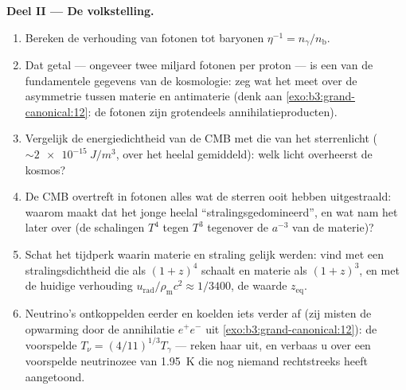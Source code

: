 \begin{problem}
\medskip\noindent\textbf{Deel II --- De volkstelling.}
\begin{enumerate}[resume]
  \item Bereken de verhouding van fotonen tot baryonen $\eta^{-1} =
        n_\gamma/n_{\text{b}}$.
  \item Dat getal --- ongeveer twee miljard fotonen per proton --- is een
        van de fundamentele gegevens van de kosmologie: zeg wat het meet
        over de asymmetrie tussen materie en antimaterie (denk aan
        \cref{exo:b3:grand-canonical:12}: de fotonen zijn grotendeels
        annihilatieproducten).
  \item Vergelijk de energiedichtheid van de CMB met die van het
        sterrenlicht ($\sim\qty{2e-15}{J/m^3}$, over het heelal
        gemiddeld): welk licht overheerst de kosmos?
  \item De CMB overtreft in fotonen alles wat de sterren ooit hebben
        uitgestraald: waarom maakt dat het jonge heelal
        ``stralingsgedomineerd'', en wat nam het later over (de schalingen
        $T^4$ tegen $T^3$ tegenover de $a^{-3}$ van de materie)?
  \item Schat het tijdperk waarin materie en straling gelijk werden: vind
        met een stralingsdichtheid die als $(1+z)^4$ schaalt en materie
        als $(1+z)^3$, en met de huidige verhouding
        $u_{\text{rad}}/\rho_{\text{m}}c^2 \approx 1/3400$, de waarde
        $z_{\text{eq}}$.
  \item Neutrino's ontkoppelden eerder en koelden iets verder af (zij
        misten de opwarming door de annihilatie $e^+e^-$ uit
        \cref{exo:b3:grand-canonical:12}): de voorspelde $T_\nu = (4/11)^{1/3}T_\gamma$ --- reken haar uit, en verbaas u over een
        voorspelde neutrinozee van \qty{1.95}{K} die nog niemand
        rechtstreeks heeft aangetoond.
\end{enumerate}


\end{problem}
